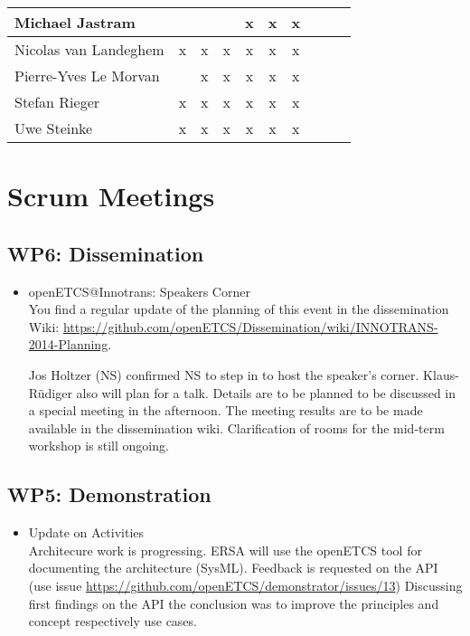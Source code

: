 \documentclass[a4paper, 11pt]{article}
\begin{document}
\begin{tabular}{|l|c|c|c||c|c|c||c|c|c|}
Michael Jastram      &   &   &   & x & x & x \\\hline
Nicolas van Landeghem& x & x & x & x & x & x \\\hline
Pierre-Yves Le Morvan&   & x & x & x & x & x \\\hline
Stefan Rieger        & x & x & x & x & x & x \\\hline
Uwe Steinke          & x & x & x & x & x & x \\\hline
\end{tabular}


\section{Scrum Meetings}

\subsection{WP6: Dissemination}

\begin{itemize}
\item openETCS@Innotrans: Speakers Corner\\
You find a regular update of the planning of this event in the dissemination Wiki:
\url{https://github.com/openETCS/Dissemination/wiki/INNOTRANS-2014-Planning}.

Jos Holtzer (NS) confirmed NS to step in to host the speaker's corner. Klaus-R\"udiger also will plan for a talk. Details are to be planned to be discussed in a special meeting in the afternoon. The meeting results are to be made available in the dissemination wiki. Clarification of rooms for the mid-term workshop is still ongoing.

\end{itemize}

\subsection{WP5: Demonstration}
\begin{itemize}
\item Update on Activities\\
Architecure work is progressing. ERSA will use the openETCS tool for documenting the architecture (SysML). Feedback is requested on the API (use issue \url{https://github.com/openETCS/demonstrator/issues/13})
Discussing first findings on the API the conclusion was to improve the principles and concept respectively  use cases.
\end{itemize}
\end{document}
